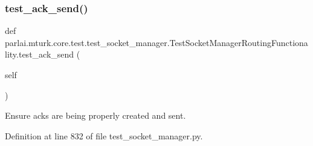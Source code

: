 \subsubsection{\texorpdfstring{test\+\_\+ack\+\_\+send()}{test\_ack\_send()}}
{\footnotesize\ttfamily def parlai.\+mturk.\+core.\+test.\+test\+\_\+socket\+\_\+manager.\+Test\+Socket\+Manager\+Routing\+Functionality.\+test\+\_\+ack\+\_\+send (\begin{DoxyParamCaption}\item[{}]{self }\end{DoxyParamCaption})}

\begin{DoxyVerb}Ensure acks are being properly created and sent.
\end{DoxyVerb}
 

Definition at line 832 of file test\+\_\+socket\+\_\+manager.\+py.


